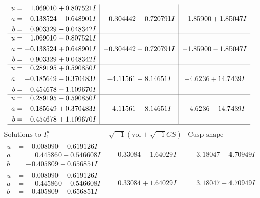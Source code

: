 \documentclass[1p]{elsarticle_modified}
\theoremstyle{definition}
\newcommand{\I}{\sqrt{-1}}
\begin{document}
$$\begin{array}{c|c|c}
\begin{aligned}
u &= \phantom{-}1.069010 + 0.807521 I \\
a &= -0.138524 - 0.648901 I \\
b &= \phantom{-}0.903329 - 0.048342 I\end{aligned}
 & -0.304442 - 0.720791 I & -1.85900 + 1.85047 I \\ \hline\begin{aligned}
u &= \phantom{-}1.069010 - 0.807521 I \\
a &= -0.138524 + 0.648901 I \\
b &= \phantom{-}0.903329 + 0.048342 I\end{aligned}
 & -0.304442 + 0.720791 I & -1.85900 - 1.85047 I \\ \hline\begin{aligned}
u &= \phantom{-}0.289195 + 0.590850 I \\
a &= -0.185649 - 0.370483 I \\
b &= \phantom{-}0.454678 - 1.109670 I\end{aligned}
 & -4.11561 - 8.14651 I & -4.6236 + 14.7439 I \\ \hline\begin{aligned}
u &= \phantom{-}0.289195 - 0.590850 I \\
a &= -0.185649 + 0.370483 I \\
b &= \phantom{-}0.454678 + 1.109670 I\end{aligned}
 & -4.11561 + 8.14651 I & -4.6236 - 14.7439 I\\
 \hline 
 \end{array}$$\newpage$$\begin{array}{c|c|c}  
\text{Solutions to }I^u_{1}& \I (\text{vol} + \sqrt{-1}CS) & \text{Cusp shape}\\
 \hline 
\begin{aligned}
u &= -0.008090 + 0.619126 I \\
a &= \phantom{-}0.445860 + 0.546608 I \\
b &= -0.405809 + 0.656851 I\end{aligned}
 & \phantom{-}0.33084 - 1.64029 I & \phantom{-}3.18047 + 4.70949 I \\ \hline\begin{aligned}
u &= -0.008090 - 0.619126 I \\
a &= \phantom{-}0.445860 - 0.546608 I \\
b &= -0.405809 - 0.656851 I\end{aligned}
 & \phantom{-}0.33084 + 1.64029 I & \phantom{-}3.18047 - 4.70949 I \\ \hline\begin{aligned}

\end{aligned}
\end{array}$$
\end{document}
